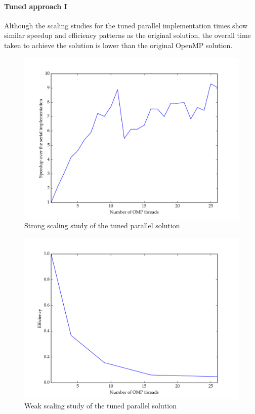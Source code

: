 \documentclass[11pt]{article}
\begin{document}
\paragraph{Tuned approach I}

Although the scaling studies for the tuned parallel implementation times show similar speedup and efficiency patterns as the original solution, the overall time taken to achieve the solution is lower than the original OpenMP solution. 
\begin{figure}[H]
\centering
\includegraphics[scale=0.5]{./scaling_studies/strong_scaling_elliot.png}
\caption{Strong scaling study of the tuned parallel solution}
\label{fig:ss_elliot}
\end{figure}

\begin{figure}[H]
\centering
\includegraphics[scale=0.5]{./scaling_studies/weak_scaling_elliot.png}
\caption{Weak scaling study of the tuned parallel solution}
\label{fig:ws_elliot}
\end{figure}
\end{document}
